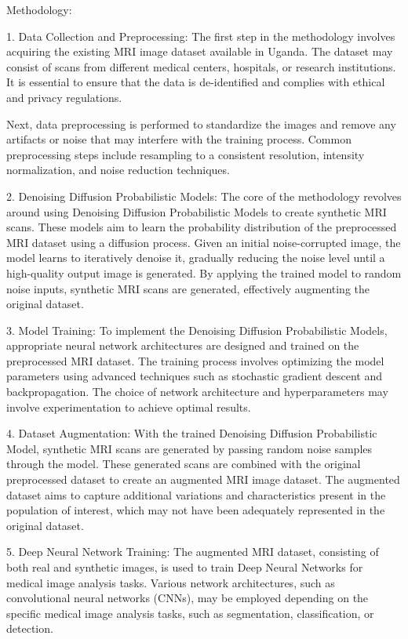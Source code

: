 Methodology:

1. Data Collection and Preprocessing:
The first step in the methodology involves acquiring the existing MRI image dataset available in Uganda. The dataset may consist of scans from different medical centers, hospitals, or research institutions. It is essential to ensure that the data is de-identified and complies with ethical and privacy regulations.

Next, data preprocessing is performed to standardize the images and remove any artifacts or noise that may interfere with the training process. Common preprocessing steps include resampling to a consistent resolution, intensity normalization, and noise reduction techniques.

2. Denoising Diffusion Probabilistic Models:
The core of the methodology revolves around using Denoising Diffusion Probabilistic Models to create synthetic MRI scans. These models aim to learn the probability distribution of the preprocessed MRI dataset using a diffusion process. Given an initial noise-corrupted image, the model learns to iteratively denoise it, gradually reducing the noise level until a high-quality output image is generated. By applying the trained model to random noise inputs, synthetic MRI scans are generated, effectively augmenting the original dataset.

3. Model Training:
To implement the Denoising Diffusion Probabilistic Models, appropriate neural network architectures are designed and trained on the preprocessed MRI dataset. The training process involves optimizing the model parameters using advanced techniques such as stochastic gradient descent and backpropagation. The choice of network architecture and hyperparameters may involve experimentation to achieve optimal results.

4. Dataset Augmentation:
With the trained Denoising Diffusion Probabilistic Model, synthetic MRI scans are generated by passing random noise samples through the model. These generated scans are combined with the original preprocessed dataset to create an augmented MRI image dataset. The augmented dataset aims to capture additional variations and characteristics present in the population of interest, which may not have been adequately represented in the original dataset.

5. Deep Neural Network Training:
The augmented MRI dataset, consisting of both real and synthetic images, is used to train Deep Neural Networks for medical image analysis tasks. Various network architectures, such as convolutional neural networks (CNNs), may be employed depending on the specific medical image analysis tasks, such as segmentation, classification, or detection.

